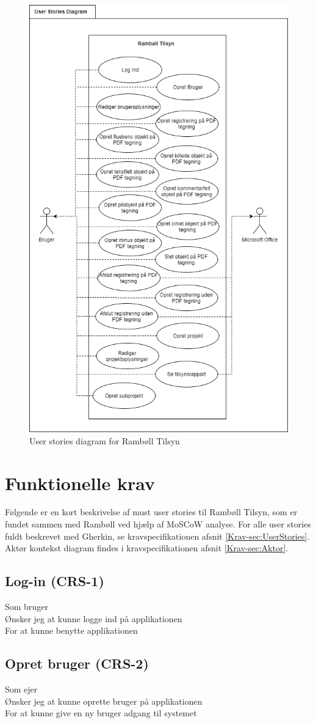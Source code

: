 	\begin{figure}[H]
		\centering
		\includegraphics[width=0.6\linewidth]{Kravspecifikation/UserStorieDiagram}
		\caption{User stories diagram for Rambøll Tilsyn}
		\label{fig:Userstoriediagram}
	\end{figure}
	
	\clearpage
	
	\section{Funktionelle krav} 
	Følgende er en kort beskrivelse af must user stories til Rambøll Tilsyn, som er fundet sammen med Rambøll ved hjælp af MoSCoW analyse. \cite{MoSCoW} For alle user stories fuldt beskrevet med Gherkin, se kravspecifikationen afsnit \ref{Krav-sec:UserStories}.
	Aktør kontekst diagram findes i kravspecifikationen afsnit \ref{Krav-sec:Aktor}.

	\subsection*{Log-in (CRS-1)}
	Som bruger\\
	Ønsker jeg at kunne logge ind på applikationen\\
	For at kunne benytte applikationen
	
	\subsection*{Opret bruger (CRS-2)}
	Som ejer\\
	Ønsker jeg at kunne oprette bruger på applikationen\\
	For at kunne give en ny bruger adgang til systemet
	
